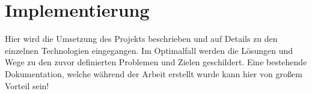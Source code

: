 \chapter{Implementierung}
Hier wird die Umsetzung des Projekts beschrieben und auf Details zu den einzelnen Technologien eingegangen. Im Optimalfall werden die Lösungen und Wege zu den zuvor definierten Problemen und Zielen geschildert. Eine bestehende Dokumentation, welche während der Arbeit erstellt wurde kann hier von großem Vorteil sein!